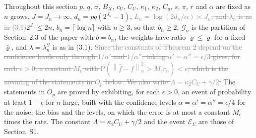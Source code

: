 \documentclass[10pt]{book}
\theoremstyle{definition}
\newcommand{\Prob}{\mathrm{P}}
\newcommand{\normn}[1]{\left\lVert #1 \right\rVert_{n}}
\newcommand{\pen}{\lambda}
\newcommand{\penn}{\lambda_{n}}
\newcommand{\Gcal}{\mathcal{G}}
\newcommand{\bn}{b_{n}}
\newcommand{\lamG}{\lambda^{\mathcal{G}}_{n}}
\newcommand{\ESig}{\mathcal{E}_{\Sigma}}
\begin{document}
Throughout this section $p$, $q$, $\sigma$, $B_X$, $c_U$, $C_U$, $\kappa_1$,
$\kappa_2$, $C_g$, $s$, $\pi$, $r$ and $\alpha$ are fixed as $n$ grows,
$J = J_n \to \infty$, $d_n = pq(2^{J_n}-1)$,
\textcolor{gray}{\sout{$L_n = \log(2d_n/\alpha) \asymp J_n$, and $\penn$ is as in (3.1)}}\textcolor{colR1}{$2^{J_n} \le 2n$,
$\bn = \lceil\log n\rceil$ with $n \ge 3$, so that $\bn \ge 2$, $\Gcal_{n}$ is
the partition of Section~2.3 of the paper with $b = \bn$, the weights have
ratio $\varrho \le \bar\varrho$ for a fixed $\bar\varrho$, and $\pen = \lamG$
is as in (3.1)}. \textcolor{gray}{\sout{Since the
constants of Theorem 2 depend on the confidence levels only through
$1/\alpha'$ and $1/\alpha''$, taking $\alpha' = \alpha'' = \epsilon/3$ gives,
for each $\epsilon>0$, a constant $M_\epsilon$ with
$\Prob(\normn{\widehat{f}-f}^2 > M_\epsilon r_n) < \epsilon$, which is the
meaning of the statements in $O_p$ below. We also write
$\Lambda = \kappa_2C_U+\gamma/2$.}} \textcolor{colR1}{The statements in $O_p$
are proved by exhibiting, for each $\epsilon > 0$, an event of probability at
least $1-\epsilon$ for $n$ large, built with the confidence levels
$\alpha = \alpha' = \alpha'' = \epsilon/4$ for the noise, the bias and the
levels, on which the error is at most a constant $M_\epsilon$ times the rate.
The constant $\Lambda = \kappa_2C_U + \gamma/2$ and the event $\ESig$ are those
of Section~S1.}
\end{document}
